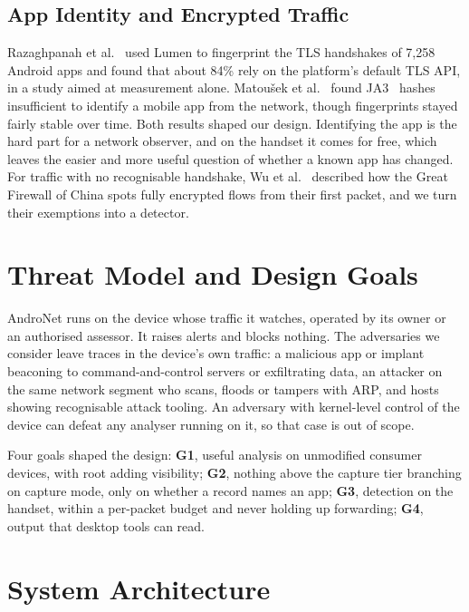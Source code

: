 \documentclass[runningheads]{llncs}
\begin{document}
\subsection{App Identity and Encrypted Traffic}

Razaghpanah et al.~\cite{razaghpanah} used Lumen to fingerprint the TLS handshakes of 7,258 Android apps and found that about 84\% rely on the platform's default TLS API, in a study aimed at measurement alone. Matou\v{s}ek et al.~\cite{matousek} found JA3~\cite{ja3} hashes insufficient to identify a mobile app from the network, though fingerprints stayed fairly stable over time. Both results shaped our design. Identifying the app is the hard part for a network observer, and on the handset it comes for free, which leaves the easier and more useful question of whether a known app has changed. For traffic with no recognisable handshake, Wu et al.~\cite{wu2023} described how the Great Firewall of China spots fully encrypted flows from their first packet, and we turn their exemptions into a detector.

\section{Threat Model and Design Goals}\label{sec:threat}

AndroNet runs on the device whose traffic it watches, operated by its owner or an authorised assessor. It raises alerts and blocks nothing. The adversaries we consider leave traces in the device's own traffic: a malicious app or implant beaconing to command-and-control servers or exfiltrating data, an attacker on the same network segment who scans, floods or tampers with ARP, and hosts showing recognisable attack tooling. An adversary with kernel-level control of the device can defeat any analyser running on it, so that case is out of scope.

Four goals shaped the design: \textbf{G1}, useful analysis on unmodified consumer devices, with root adding visibility; \textbf{G2}, nothing above the capture tier branching on capture mode, only on whether a record names an app; \textbf{G3}, detection on the handset, within a per-packet budget and never holding up forwarding; \textbf{G4}, output that desktop tools can read.

\section{System Architecture}\label{sec:architecture}
\end{document}
